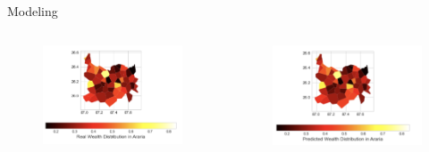 \documentclass[t]{beamer}
\begin{document}
\begin{frame}{Modeling}
	\begin{columns}[T,totalwidth=\textwidth]
        \begin{column}{0.45\textwidth}
	        \begin{figure}
				\vspace{-\blocktitlesize}
				\includegraphics[height=0.45\paperheight,keepaspectratio]{images/real.png}
			\end{figure}
	    \end{column}
	    
	    \begin{column}{0.55\textwidth}
			\begin{figure}
				\vspace{-\blocktitlesize}
				\includegraphics[height=0.45\paperheight,keepaspectratio]{images/preds.png}
			\end{figure}
  		\end{column}
  	\end{columns}
\end{frame}
\end{document}
